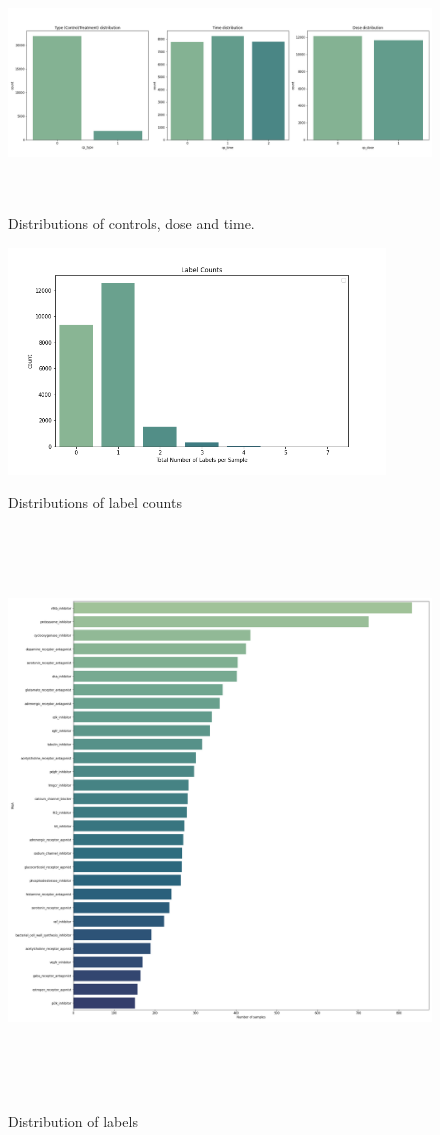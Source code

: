\documentclass[bsc,frontabs,twoside,singlespacing,parskip,deptreport]{infthesis}     %
\begin{document}
\begin{figure}[h!]
\caption{Distributions of controls, dose and time.}
\includegraphics[height=6cm]{images/dist_plot.png}\label{cat_dist}
\end{figure}
\begin{figure}[h!]
\caption{Distributions of label counts}
\includegraphics[height=6cm]{images/label_counts.png}\label{label_counts}
\end{figure}
\begin{figure}[h!]
\centering
\caption{Distribution of labels}
\includegraphics[height=15cm]{images/label_dist.png}\label{label_dist}
\end{figure}
\end{document}

